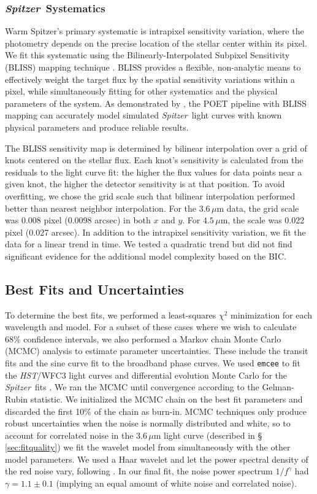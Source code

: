 \documentclass[twocolumn, trackchanges]{aastex61}
\newcommand{\project}[1]{\textsl{#1}}
\newcommand{\HST}{\project{HST}}
\newcommand{\Spitzer}{\project{Spitzer}}
\begin{document}
\subsubsection{\Spitzer\ Systematics}
Warm Spitzer's primary systematic is intrapixel sensitivity variation, where the photometry depends on the precise location of the stellar center within its pixel.  We fit this systematic using the Bilinearly-Interpolated Subpixel Sensitivity (BLISS) mapping technique \citep{stevenson12}.  BLISS provides a flexible, non-analytic means to effectively weight the target flux by the spatial sensitivity variations within a pixel, while simultaneously fitting for other systematics and the physical parameters of the system. As demonstrated by \citet{Ingalls2016}, the POET pipeline with BLISS mapping can accurately model simulated \Spitzer\ light curves with known physical parameters and produce reliable results.

The BLISS sensitivity map is determined by bilinear interpolation over a grid of knots centered on the stellar flux. Each knot's sensitivity is calculated from the residuals to the light curve fit: the higher the flux values for data points near a given knot, the higher the detector sensitivity is at that position.  To avoid overfitting, we chose the grid scale such that bilinear interpolation performed better than nearest neighbor interpolation. For the $3.6\,\mu$m data, the grid scale was 0.008 pixel (0.0098 arcsec) in both $x$ and $y$. For $4.5\,\mu$m, the scale was 0.022 pixel (0.027 arcsec).  In addition to the intrapixel sensitivity variation, we fit the data for a linear trend in time. We tested a quadratic trend but did not find significant evidence for the additional model complexity based on the BIC.  

\subsection{Best Fits and Uncertainties}
To determine the best fits, we performed a least-squares $\chi^2$ minimization for each wavelength and model. For a subset of these cases where we wish to calculate 68\% confidence intervals, we also performed a Markov chain Monte Carlo (MCMC) analysis to estimate parameter uncertainties. These include the transit fits and the sine curve fit to the broadband phase curves. We used \texttt{emcee} \citep{foremanmackey13} to fit the \HST/WFC3 light curves and differential evolution Monte Carlo for the \Spitzer\ fits \citep{braak06}. We ran the MCMC until convergence according to the Gelman-Rubin statistic. We initialized the MCMC chain on the best fit parameters and discarded the first 10\% of the chain as burn-in. MCMC techniques only produce robust uncertainties when the noise is normally distributed and white, so to account for correlated noise in the $3.6\,\mu$m light curve (described in \S\,\ref{sec:fitquality}) we fit the wavelet model from \cite{carter09} simultaneously with the other model parameters. We used a Haar wavelet and let the power spectral density of the red noise vary, following \cite{diamond-lowe14}. In our final fit, the noise power spectrum $1/f^\gamma$ had $\gamma = 1.1 \pm 0.1$ (implying an equal amount of white noise and correlated noise).  
\end{document}
